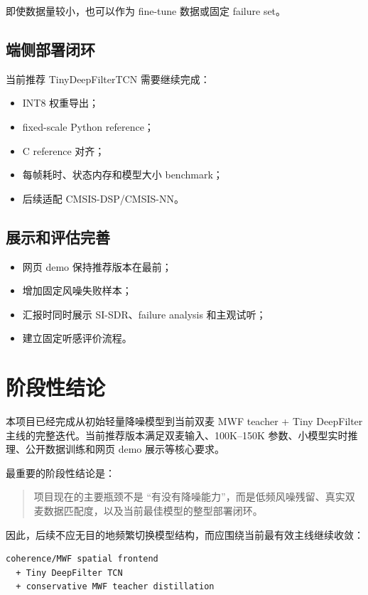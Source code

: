 \documentclass[UTF8,12pt,a4paper]{ctexart}
\begin{document}
即使数据量较小，也可以作为 fine-tune 数据或固定 failure set。

\subsection{端侧部署闭环}

当前推荐 TinyDeepFilterTCN 需要继续完成：

\begin{itemize}
  \item INT8 权重导出；
  \item fixed-scale Python reference；
  \item C reference 对齐；
  \item 每帧耗时、状态内存和模型大小 benchmark；
  \item 后续适配 CMSIS-DSP/CMSIS-NN。
\end{itemize}

\subsection{展示和评估完善}

\begin{itemize}
  \item 网页 demo 保持推荐版本在最前；
  \item 增加固定风噪失败样本；
  \item 汇报时同时展示 SI-SDR、failure analysis 和主观试听；
  \item 建立固定听感评价流程。
\end{itemize}

\section{阶段性结论}

本项目已经完成从初始轻量降噪模型到当前双麦 MWF teacher + Tiny DeepFilter 主线的完整迭代。当前推荐版本满足双麦输入、100K--150K 参数、小模型实时推理、公开数据训练和网页 demo 展示等核心要求。

最重要的阶段性结论是：

\begin{quote}
项目现在的主要瓶颈不是 ``有没有降噪能力''，而是低频风噪残留、真实双麦数据匹配度，以及当前最佳模型的整型部署闭环。
\end{quote}

因此，后续不应无目的地频繁切换模型结构，而应围绕当前最有效主线继续收敛：

\begin{lstlisting}
coherence/MWF spatial frontend
  + Tiny DeepFilter TCN
  + conservative MWF teacher distillation
\end{lstlisting}
\end{document}
